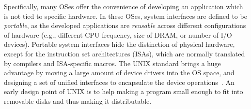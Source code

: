 Specifically, many OSes offer the convenience of developing an application
which is not tied to specific hardware.
In these OSes, system interfaces are defined to be {\em portable},
as the developed applications are {\em reusable} across different configurations of hardware (e.g., different CPU frequency, size of DRAM, or number of I/O devices).
Portable system interfaces hide the distinction of physical hardware,
except for the instruction set architectures (ISAs), which are normally translated by compilers and ISA-specific macros.
The UNIX standard brings a huge advantage by
moving a large amount of device drivers
into the OS space, and designing a set of unified interfaces to encapsulate the device operations~\cite{ritchie74unix}.
An early design point of UNIX is to help making a program small enough to fit into
removable disks and thus making it distributable.

